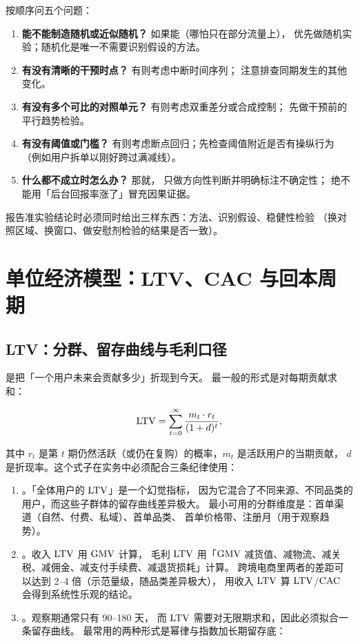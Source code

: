 \begin{toolbox}
按顺序问五个问题：
\begin{enumerate}
  \item \textbf{能不能制造随机或近似随机？} 如果能（哪怕只在部分流量上），
        优先做随机实验；随机化是唯一不需要识别假设的方法。
  \item \textbf{有没有清晰的干预时点？} 有则考虑中断时间序列；
        注意排查同期发生的其他变化。
  \item \textbf{有没有多个可比的对照单元？} 有则考虑双重差分或合成控制；
        先做干预前的平行趋势检验。
  \item \textbf{有没有阈值或门槛？} 有则考虑断点回归；先检查阈值附近是否有操纵行为
        （例如用户拆单以刚好跨过满减线）。
  \item \textbf{什么都不成立时怎么办？} 那就，
        只做方向性判断并明确标注不确定性；
        绝不能用「后台回报率涨了」冒充因果证据。
\end{enumerate}
报告准实验结论时必须同时给出三样东西：方法、识别假设、稳健性检验
（换对照区域、换窗口、做安慰剂检验的结果是否一致）。
\end{toolbox}

\section{单位经济模型：LTV、CAC 与回本周期}

\subsection{LTV：分群、留存曲线与毛利口径}

 是把「一个用户未来会贡献多少」折现到今天。
最一般的形式是对每期贡献求和：

\begin{equation}
\operatorname{LTV} = \sum_{t=0}^{\infty} \frac{m_t \cdot r_t}{(1+d)^{t}} ,
\label{eq:growth-ltv-sum}
\end{equation}

其中 $r_t$ 是第 $t$ 期仍然活跃（或仍在复购）的概率，$m_t$ 是活跃用户的当期贡献，
$d$ 是折现率。这个式子在实务中必须配合三条纪律使用：

\begin{enumerate}
  \item {}。「全体用户的 $\operatorname{LTV}$」是一个幻觉指标，
        因为它混合了不同来源、不同品类的用户，而这些子群体的留存曲线差异极大。
        最小可用的分群维度是：首单渠道（自然、付费、私域）、首单品类、
        首单价格带、注册月（用于观察趋势）。
  \item {}。收入 $\operatorname{LTV}$ 用 $\operatorname{GMV}$ 计算，
        毛利 $\operatorname{LTV}$ 用「$\operatorname{GMV}$ 减货值、减物流、减关税、减佣金、减支付手续费、减退货损耗」计算。
        跨境电商里两者的差距可以达到 2--4 倍（示范量级，随品类差异极大），
        用收入 $\operatorname{LTV}$ 算 $\operatorname{LTV}$/$\operatorname{CAC}$ 会得到系统性乐观的结论。
  \item {}。观察期通常只有 90--180 天，
        而 $\operatorname{LTV}$ 需要对无限期求和，因此必须拟合一条留存曲线。
        最常用的两种形式是幂律与指数加长期留存底：
\end{enumerate}

